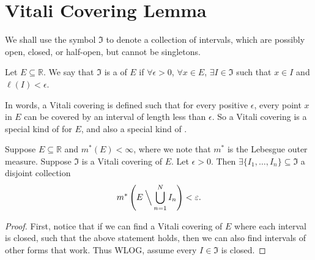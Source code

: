 \documentclass[notoc,notitlepage]{tufte-book}
\begin{document}

\section{Vitali Covering Lemma}%
\label{sec:vitali_covering_lemma}

\begin{notation}
  We shall use the symbol $\mathfrak{I}$ to denote a collection of intervals,
  which are possibly open, closed, or half-open, but cannot be singletons.
\end{notation}

\begin{defn}\label{defn:vitali_covering}
  Let $E \subseteq \mathbb{R}$. We say that $\mathfrak{I}$
  is a  of $E$ if $\forall \epsilon > 0$,
  $\forall x \in E$, $\exists I \in \mathfrak{I}$ such that $x \in I$
  and $\ell(I) < \epsilon$.
\end{defn}

\begin{remark}
  In words, a Vitali covering is defined such that for every positive $\epsilon$,
  every point $x$ in $E$ can be covered by an interval of length less than $\epsilon$.
  So a Vitali covering is a special kind of
  \href{https://tex.japorized.ink/PMATH351F18/classnotes.pdf\#defn.70}{} for $E$,
  and also a special kind of
  \href{https://tex.japorized.ink/PMATH351F18/classnotes.pdf\#defn.75}{}.
\end{remark}

\begin{thm}\label{thm:vitali_covering_lemma}
  Suppose $E \subseteq \mathbb{R}$ and $m^*(E) < \infty$, where we note that
  $m^*$ is the Lebesgue outer measure.
  Suppose $\mathfrak{I}$ is a Vitali covering of $E$.
  Let $\epsilon > 0$.
  Then $\exists \{ I_1, \ldots, I_n \} \subseteq \mathfrak{I}$
  a disjoint collection
  \begin{equation*}
    m^* \left( E \mathbin{\Big\backslash} \bigcup_{n=1}^{N} I_n \right) < \epsilon.
  \end{equation*}
\end{thm}

\begin{proof}
  First, notice that if we can find a Vitali covering of $E$ where each interval
  is closed, such that the above statement holds, then we can also find
  intervals of other forms that work. Thus WLOG, assume every $I \in
  \mathfrak{I}$ is closed.

\end{proof}
\end{document}
